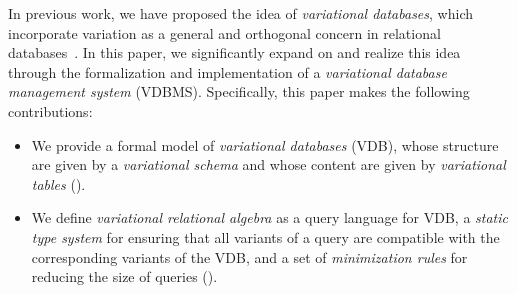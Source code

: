 In previous work, we have proposed the idea of \emph{variational databases},
which incorporate variation as a general and orthogonal concern in relational
databases~\cite{ATW17dbpl,ATW18poly}. In this paper, we significantly expand on
and realize this idea through the formalization and implementation of a
\emph{variational database management system} (VDBMS).
%
Specifically, this paper makes the following contributions:
%
\begin{itemize}[leftmargin=*]
\itemsep0em

\item We provide a formal model of \emph{variational databases} (VDB), whose
structure are given by a \emph{variational schema} and whose content are given
by \emph{variational tables} ().
\item We define \emph{variational relational algebra} as a query language for
VDB, a \emph{static type system} for ensuring that all variants of a query are
compatible with the corresponding variants of the VDB, and a set of
\emph{minimization rules} for reducing the size of queries ().

\end{itemize}
